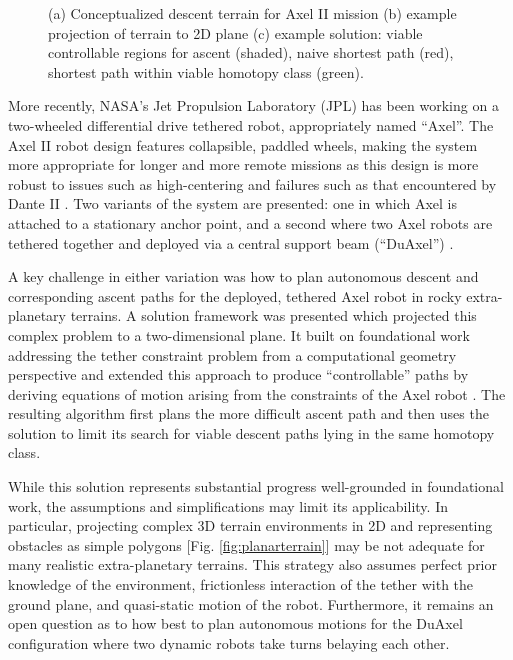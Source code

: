 \documentclass[12pt]{article}
\begin{document}
\begin{figure}
\begin{subfigure}{.2\textwidth}
    \caption{}
    \label{fig:planarpath}
  \end{subfigure}  %
  \label{fig:dsolution}
  \vspace{-0.1in}
  \caption{(a) Conceptualized descent terrain for Axel II mission (b) example projection of terrain to 2D plane
  (c) example solution: viable controllable regions for ascent (shaded), naive shortest path (red), shortest path within
  viable homotopy class (green). }
\end{figure}


More recently, NASA's Jet Propulsion
Laboratory (JPL) has been working on
a two-wheeled differential drive tethered
robot, appropriately named ``Axel''. The
Axel II robot design features collapsible,
paddled wheels, making the system more appropriate
for longer and more remote missions
as this design is more robust to issues
such as high-centering and failures such as
that encountered by Dante II \cite{axel_design}. Two variants
of the system are presented: one in
which Axel is attached to a stationary anchor
point, and a second where two Axel
robots are tethered together and deployed
via a central support beam (``DuAxel'') \cite{duaxel}.


A key challenge in either variation was how
to plan autonomous descent and corresponding
ascent paths for the deployed, tethered
Axel robot in rocky extra-planetary terrains.
A solution framework was presented which
projected this complex problem to a two-dimensional
plane. It built on foundational
work addressing the tether constraint problem
from a computational geometry perspective
\cite{ties_that_bind, min_homotopies} and extended this approach to produce ``controllable'' paths by deriving equations
of motion arising from the constraints of the Axel robot \cite{axel_planning}. The resulting algorithm first
plans the more difficult ascent path and then uses the solution to limit its search for viable
descent paths lying in the same homotopy class.

While this solution represents substantial progress well-grounded in foundational work,
the assumptions and simplifications may limit its applicability. In particular, projecting
complex 3D terrain environments in 2D and representing obstacles as simple polygons [Fig. \ref{fig:planarterrain}]
may be not adequate for many realistic extra-planetary terrains. This strategy also
assumes perfect prior knowledge of the environment, frictionless interaction of the tether
with the ground plane, and quasi-static motion of the robot. Furthermore, it remains an
open question as to how best to plan autonomous motions for the DuAxel configuration
where two dynamic robots take turns belaying each other.
\end{document}
